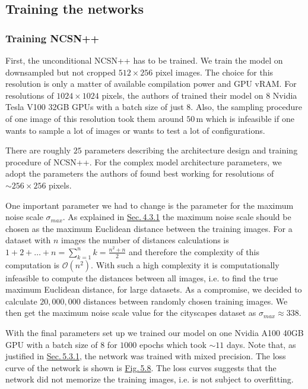 \subsection{Training the networks} \label{sec:5.4.3}
\subsubsection{Training NCSN++}
First, the unconditional NCSN++ has to be trained. We train the model on downsampled but not cropped $512\times256$ pixel images. The choice for this resolution is only a matter of available compilation power and GPU vRAM. For resolutions of $1024\times1024$ pixels, the authors of \cite{score_3} trained their model on $8$ Nvidia Tesla V100 32GB GPUs with a batch size of just $8$. Also, the sampling procedure of one image of this resolution took them around $50$\,m which is infeasible if one wants to sample a lot of images or wants to test a lot of configurations. 

There are roughly $25$ parameters describing the architecture design and training procedure of NCSN++. For the complex model architecture parameters, we adopt the parameters the authors of \cite{score_3} found best working for resolutions of $\sim256\times256$ pixels. 

One important parameter we had to change is the parameter for the maximum noise scale $\sigma_{max}$. As explained in \hyperref[sec:4.3.1]{Sec.\,4.3.1} the maximum noise scale should be chosen as the maximum Euclidean distance between the training images. For a dataset with $n$ images the number of distances calculations is $1+2+\dots+n=\sum_{k=1}^nk=\frac{n^2+n}{2}$ and therefore the complexity of this computation is $\mathcal{O}(n^2)$. With such a high complexity it is computationally infeasible to compute the distances between all images, i.e. to find the true maximum Euclidean distance, for large datasets. As a compromise, we decided to calculate $20{,}000{,}000$ distances between randomly chosen training images. We then get the maximum noise scale value for the cityscapes dataset as $\sigma_{max}\approx338$.

With the final parameters set up we trained our model on one Nvidia A100 40GB GPU with a batch size of $8$ for $1000$ epochs which took $\sim11$ days. Note that, as justified in \hyperref[sec:5.3.1]{Sec.\,5.3.1}, the network was trained with mixed precision. The loss curve of the network is shown is \hyperref[fig:5.8]{Fig.\,5.8}. The loss curves suggests that the network did not memorize the training images, i.e. is not subject to overfitting.

